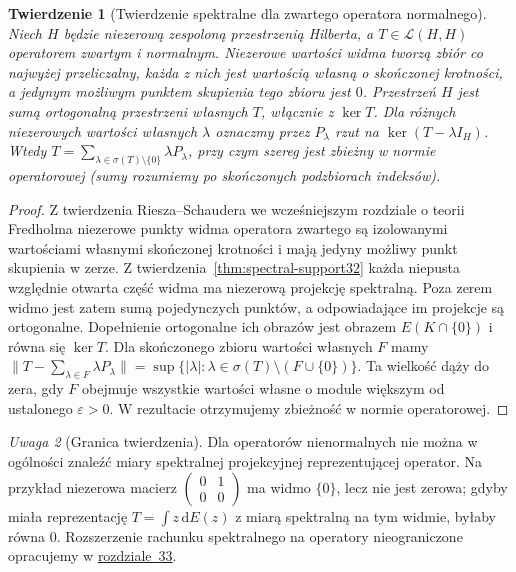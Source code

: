 \documentclass[11pt,a4paper]{article}
\numberwithin{equation}{section}
\theoremstyle{plain}
\newtheorem{twierdzenie}{Twierdzenie}[section]
\theoremstyle{definition}
\theoremstyle{remark}
\newtheorem{uwaga}[twierdzenie]{Uwaga}
\begin{document}
\begin{twierdzenie}[Twierdzenie spektralne dla zwartego operatora normalnego]
\label{thm:compact-normal32}
Niech $H$ będzie niezerową zespoloną przestrzenią Hilberta,
a $T\in\mathcal L(H,H)$ operatorem zwartym i normalnym.
Niezerowe wartości widma tworzą zbiór co najwyżej przeliczalny,
każda z nich jest wartością własną o skończonej krotności,
a jedynym możliwym punktem skupienia tego zbioru jest $0$.
Przestrzeń $H$ jest sumą ortogonalną przestrzeni własnych $T$,
włącznie z $\ker T$. Dla różnych niezerowych wartości
własnych $\lambda$ oznaczmy przez $P_\lambda$ rzut na
$\ker(T-\lambda I_H)$. Wtedy
$T=\sum_{\lambda\in\sigma(T)\setminus\{0\}}
\lambda P_\lambda$, przy czym szereg jest zbieżny w normie
operatorowej (sumy rozumiemy po skończonych podzbiorach indeksów).
\end{twierdzenie}
\begin{proof}
Z twierdzenia Riesza--Schaudera we wcześniejszym rozdziale o teorii Fredholma
niezerowe punkty widma operatora zwartego są izolowanymi
wartościami własnymi skończonej krotności i mają jedyny
możliwy punkt skupienia w zerze.
Z twierdzenia~\ref{thm:spectral-support32} każda niepusta
względnie otwarta część widma ma niezerową projekcję spektralną.
Poza zerem widmo jest zatem sumą pojedynczych punktów,
a odpowiadające im projekcje są ortogonalne.
Dopełnienie ortogonalne ich obrazów jest obrazem
$E(K\cap\{0\})$ i równa się $\ker T$.
Dla skończonego zbioru wartości własnych $F$ mamy
$\|T-\sum_{\lambda\in F}\lambda P_\lambda\|
=\sup\{|\lambda|:\lambda\in\sigma(T)\setminus(F\cup\{0\})\}$.
Ta wielkość dąży do zera, gdy $F$ obejmuje wszystkie
wartości własne o module większym od ustalonego $\varepsilon>0$.
W rezultacie otrzymujemy zbieżność w normie operatorowej.
\end{proof}

\begin{uwaga}[Granica twierdzenia]
Dla operatorów nienormalnych nie można w ogólności znaleźć
miary spektralnej projekcyjnej reprezentującej operator.
Na przykład niezerowa macierz
$\left(\begin{smallmatrix}0&1\\0&0\end{smallmatrix}\right)$
ma widmo $\{0\}$, lecz nie jest zerowa; gdyby miała reprezentację
$T=\int z\,\mathrm dE(z)$ z miarą spektralną na tym widmie,
byłaby równa $0$. Rozszerzenie rachunku spektralnego na
operatory nieograniczone opracujemy w \hyperref[sec:unbounded33]{rozdziale~33}.
\end{uwaga}
\end{document}
